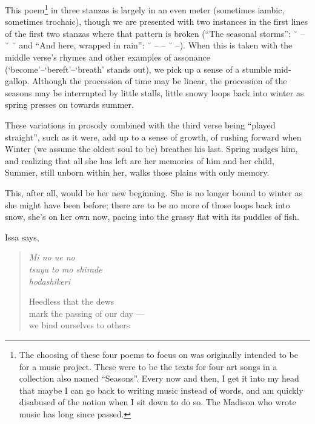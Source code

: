 This poem\footnote{The choosing of these four poems to focus on was originally intended to be for a music project. These were to be the texts for four art songs in a collection also named ``Seasons''. Every now and then, I get it into my head that maybe I can go back to writing music instead of words, and am quickly disabused of the notion when I sit down to do so. The Madison who wrote music has long since passed.} in three stanzas is largely in an even meter (sometimes iambic, sometimes trochaic), though we are presented with two instances in the first lines of the first two stanzas where that pattern is broken (``The seasonal storms'': ˘ -- ˘ ˘ and ``And here, wrapped in rain'': ˘ -- -- ˘ --). When this is taken with the middle verse's rhymes and other examples of assonance (`become'--`bereft'--`breath' stands out), we pick up a sense of a stumble mid-gallop. Although the procession of time may be linear, the procession of the seasons may be interrupted by little stalls, little snowy loops back into winter as spring presses on towards summer.

These variations in prosody combined with the third verse being ``played straight'', such as it were, add up to a sense of growth, of rushing forward when Winter (we assume the oldest soul to be) breathes his last. Spring nudges him, and realizing that all she has left are her memories of him and her child, Summer, still unborn within her, walks those plains with only memory.

This, after all, would be her new beginning. She is no longer bound to winter as she might have been before; there are to be no more of those loops back into snow, she's on her own now, pacing into the grassy flat with its puddles of fish.

Issa says,

\begin{verse}
\begin{multicols}{2}
\emph{Mi no ue no} \\
\emph{tsuyu to mo shirade} \\
\emph{hodashikeri}

\columnbreak

Heedless that the dews \\
mark the passing of our day --- \\
we bind ourselves to others
\end{multicols}
\vspace{-1em}
\parencite[11]{issa}
\end{verse}

